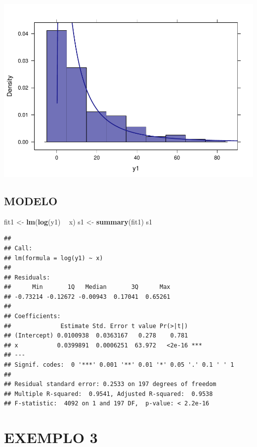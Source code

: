 \documentclass[]{article}
\newenvironment{Shaded}{\begin{snugshade}}{\end{snugshade}}
\newcommand{\KeywordTok}[1]{\textcolor[rgb]{0.13,0.29,0.53}{\textbf{#1}}}
\newcommand{\StringTok}[1]{\textcolor[rgb]{0.31,0.60,0.02}{#1}}
\newcommand{\OperatorTok}[1]{\textcolor[rgb]{0.81,0.36,0.00}{\textbf{#1}}}
\newcommand{\NormalTok}[1]{#1}
\begin{document}
\includegraphics{Impacto_sigma_files/figure-latex/unnamed-chunk-8-1.pdf}

\subsection{MODELO}\label{modelo-1}

\begin{Shaded}
\begin{Highlighting}[]
\NormalTok{fit1 <-}\StringTok{ }\KeywordTok{lm}\NormalTok{(}\KeywordTok{log}\NormalTok{(y1) }\OperatorTok{~}\StringTok{ }\NormalTok{x)}
\NormalTok{s1 <-}\StringTok{ }\KeywordTok{summary}\NormalTok{(fit1)}
\NormalTok{s1}
\end{Highlighting}
\end{Shaded}

\begin{verbatim}
## 
## Call:
## lm(formula = log(y1) ~ x)
## 
## Residuals:
##      Min       1Q   Median       3Q      Max 
## -0.73214 -0.12672 -0.00943  0.17041  0.65261 
## 
## Coefficients:
##              Estimate Std. Error t value Pr(>|t|)    
## (Intercept) 0.0100938  0.0363167   0.278    0.781    
## x           0.0399891  0.0006251  63.972   <2e-16 ***
## ---
## Signif. codes:  0 '***' 0.001 '**' 0.01 '*' 0.05 '.' 0.1 ' ' 1
## 
## Residual standard error: 0.2533 on 197 degrees of freedom
## Multiple R-squared:  0.9541, Adjusted R-squared:  0.9538 
## F-statistic:  4092 on 1 and 197 DF,  p-value: < 2.2e-16
\end{verbatim}

\section{EXEMPLO 3}\label{exemplo-3}
\end{document}
